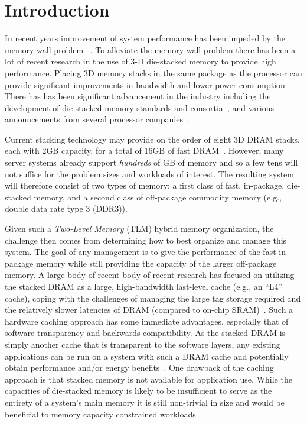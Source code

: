 \section{Introduction}
\label{sec:Introduction}

In recent years improvement of system performance has been impeded by the memory wall problem ~\cite{wulf-can95}. To alleviate the memory wall problem there has been a lot of recent research in the use of 3-D die-stacked memory to provide high performance. Placing 3D memory stacks in the same package as the processor can provide significant improvements in bandwidth and lower power consumption ~\cite{black-micro2013}.  There has 
has been significant advancement in the industry including the development of
die-stacked memory standards and consortia~\cite{jedec-wideio,JEDEC-HBM,pawlowski-hotchips2011},
and various announcements from several processor
companies~\cite{KnightsLanding,NVIDIA,black-micro2013}.

Current stacking technology may provide on the order of eight 3D DRAM stacks, each with 2GB capacity, for a total of 16GB of
fast DRAM~\cite{KnightsLanding}.  However, many server systems already support
{\em hundreds} of GB of memory and so a few tens will not suffice for the
problem sizes and workloads of interest.  The resulting system will therefore
consist of two types of memory: a first class of fast, in-package, die-stacked
memory, and a second class of off-package commodity memory (e.g., double data rate type 3 (DDR3)).

Given such a {\em Two-Level Memory} (TLM) hybrid memory organization, the challenge then
comes from determining how to best organize and manage this system. The goal of any management is to give the performance of the fast in-package memory while still providing the capacity of the larger off-package memory. 
A large body of recent body of recent research has focused on utilizing the stacked DRAM as a
large, high-bandwidth last-level cache (e.g., an ``L4'' cache), coping with the
challenges of managing the large tag storage required and the relatively slower
latencies of DRAM (compared to on-chip SRAM)~\cite{loh-micro2011,qureshi-micro2012,jevdjic-isca2013,jiang-hpca2010,zhao-iccd2007,sim-micro2012,meza-cal2012,elnacouzi-date2013,hameed-cases2013}.  
Such a hardware caching approach has some immediate advantages, especially that of
software-transparency and backwards compatibility.  As the stacked DRAM is
simply another cache that is transparent to the software layers, any existing
applications can be run on a system with such a DRAM cache and potentially
obtain performance and/or energy benefits~\cite{loh-shaw2012}. 
One drawback of the caching approach is that stacked memory is not available for application use. While the capacities of die-stacked memory is likely to be insufficient to serve as the entirety of a system's main memory it is still non-trivial in size and would be beneficial to memory capacity constrained workloads ~\cite{chou-micro2014}.

